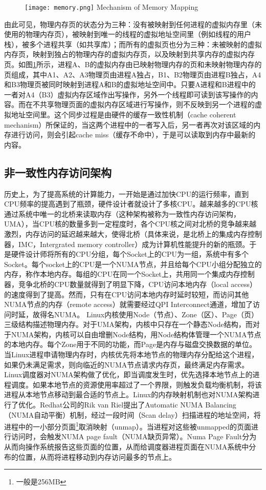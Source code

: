 \begin{figure}[!htp]
  \centering
  \texttt{[image: memory.png]}
    {Mechanism of Memory Mapping}
  \label{fig:MEM}
\end{figure}
由此可见，物理内存页的状态分为三种：没有被映射到任何进程的虚拟内存里（未使用的物理内存页），被映射到唯一的线程的虚拟地址空间里（例如线程的用户栈），被多个进程共享（如共享库）；而所有的虚拟页也分为三种：未被映射的虚拟内存页，映射到独占的物理内存的虚拟内存页，以及映射到共享内存的虚拟内存页。如图\ref{fig:MEM}所示，进程A、B的虚拟内存由已映射物理内存的页和未映射物理内存的页组成，其中A1、A2、A3物理页由进程A独占，B1、B2物理页由进程B独占，A4和B3物理页被同时映射到进程A和B的虚拟地址空间中。只要A进程和B进程中的一者对A4（B3）虚拟内存区域作出写操作，另外一个线程即可读到该写操作的内容。而在不共享物理页面的虚拟内存区域进行写操作，则不反映到另一个进程的虚拟地址空间里。这个同步过程是由硬件的缓存一致性机制（cache coherent mechanism）所保证的，当这两个进程中的一者写入后，另一者再次对该区域的内存进行访问，则会引起cache miss（缓存不命中），于是可以读取到内存中最新的内容。

\subsection{非一致性内存访问架构}
历史上，为了提高系统的计算能力，一开始是通过加快CPU的运行频率，直到CPU频率的提高遇到了瓶颈，硬件设计者就设计了多核CPU。越来越多的CPU核通过系统中唯一的北桥来读取内存（这种架构被称为一致性内存访问架构，UMA），当CPU核的数量多到一定程度时，各个CPU核之间对北桥的竞争越来越激烈，内存访问的延迟越来越大，使得北桥（具体来说，是北桥上的集成内存控制器，IMC，Intergrated memory controller）成为计算机性能提升的新的瓶颈。于是硬件设计师将所有的CPU分组，每个Socket上的CPU为一组，系统中有多个Socket。每个socket上的CPU是一个NUMA节点，并且给每个CPU小组分配独立的内存，称作本地内存。每组的CPU在同一个Socket上，共用同一个集成内存控制器，竞争北桥的CPU数量就得到了明显下降，CPU访问本地内存（local access）的速度得到了提高。然而，只有在CPU访问本地内存时延时较短，而访问其他NUMA节点的内存（remote access）就需要经过QPI Interconnect通道，增加了访问时延，故得名NUMA。
\label{chap:memm}
Linux内核使用Node（节点）、Zone（区）、Page（页）三级结构描述物理内存\cite{phymem}。对于UMA架构，内核中只存在一个静态Node结构，而对于NUMA架构，内核可以自由增删Node结构，用Node结构体管理一个NUMA节点的本地内存。每个Zone用于不同的功能，而Page是内存与磁盘交换数据的单位。当Linux进程申请物理内存时，内核优先将本地节点的物理内存分配给这个进程，如果仍未满足需求，则向临近的NUMA节点请求内存页，最终满足内存需求。Linux调度器对NUMA架构做了优化，即当调度发生时，优先选择本地节点上的进程调度。如果本地节点的资源使用率超过了一个界限，则触发负载均衡机制，将该进程从本地节点移动到最合适的节点上。Linux的内存映射机制也对NUMA架构进行了优化。Redhat公司的Rik van Riel提出了Automatic NUMA Balancing（NUMA自动平衡）机制\cite{balancing}，经过一段时间（Scan delay）扫描进程的地址空间，将进程中的一小部分页面\footnote{一般是256MB}取消映射（unmap）。当进程对这些被unmapped的页面进行访问时，会触发NUMA page fault（NUMA缺页异常）。Numa Page Fault分为从而向操作系统报告这些页面的位置，从而给调度器进程页面在NUMA系统中分布的位置，从而将进程移动到内存访问最多的节点上。

